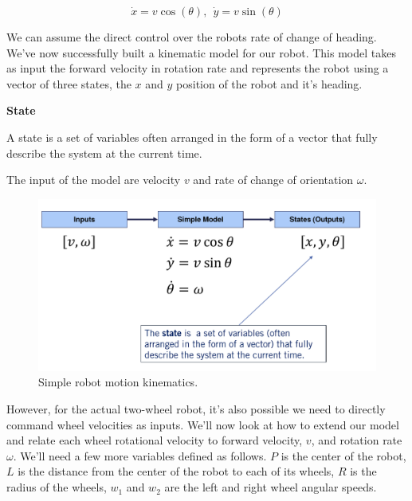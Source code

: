 \begin{equation}
\dot{x} = v \cos(\theta), ~~ \dot{y} = v\sin(\theta)
\end{equation}


We can assume the direct control over the robots rate of change of heading. We've now successfully built a kinematic model for our robot. This model takes as input the forward velocity in rotation rate and represents the robot using a vector of three states, the $x$ and $y$ position of the robot and it's heading. 


\begin{framed}
\theoremstyle{remark}
\begin{remark}{\textbf{State}}

A state is a set of variables often arranged in the form of a vector that fully describe the system at the current time.
\end{remark}
\end{framed}

The input of the model are velocity $v$ and rate of change of orientation $\omega$. 

\begin{figure}[!htb]
\begin{center}
\includegraphics[scale=0.290]{img/kinematics/simple_robot_motion_kinematics.jpeg}
\end{center}
\caption{Simple robot motion kinematics.}
\label{simple_robot_motion_kinematics}
\end{figure}

However, for the actual two-wheel robot, it's also possible we need to directly command wheel velocities as inputs. We'll now look at how to extend our model and relate each wheel rotational velocity to forward velocity, $v$, and rotation rate $\omega$. We'll need a few more variables defined as follows. $P$ is the center of the robot, $L$ is the distance from the center of the robot to each of its wheels, $R$ is the radius of the wheels, $w_1$ and $w_2$ are the left and right wheel angular speeds. 

